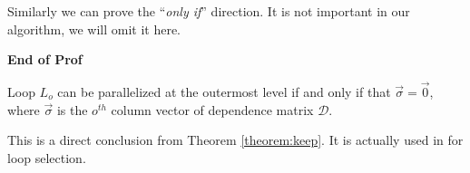 Similarly we can prove the ``\emph{only if}'' direction. It is not
important in our algorithm, we will omit it here.

\begin{flushright}
\textbf{End of Prof} 
\end{flushright}

\begin{theorem} \label{theorem:outermost}
  Loop $L_{o}$ can be parallelized at the outermost level if and only
  if that $\vec{\sigma} = \vec{0}$, where $\vec{\sigma}$ is the
  $o^{th}$ column vector of dependence matrix $\mathcal{D}$.
\end{theorem} 

This is a direct conclusion from Theorem \ref{theorem:keep}. It is
actually used in \cite{All02} for loop selection.





